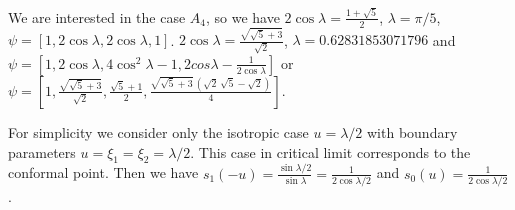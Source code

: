 \documentclass[12pt]{article}
\begin{document}





  We are interested in the case $A_4$, so we have
$2\cos\lambda=\frac{1+\sqrt{5}}{2}$, $\lambda=\pi/5$, $\psi=\left[1,2\cos\lambda,2\cos\lambda,1\right]$.
$2\cos\lambda=\frac{\sqrt{\sqrt{5}+3}}{\sqrt{2}}$,
$\lambda=0.62831853071796$ and $\psi=\left[1,2\cos\lambda,
  4\cos^2\lambda-1, 2cos\lambda-\frac{1}{2\cos\lambda}\right]$ or $\psi=\left[1,\frac{\sqrt{\sqrt{5}+3}}{\sqrt{2}},\frac{\sqrt{5}+1}{2},\frac{\sqrt{\sqrt{5}+3}\,\left( \sqrt{2}\,\sqrt{5}-\sqrt{2}\right) }{4}\right]$.

For simplicity we consider only the isotropic case $u=\lambda/2$ with boundary parameters
$u=\xi_1=\xi_2=\lambda/2$. This case in critical limit corresponds to the  conformal point. Then we have
$s_1(-u)=\frac{\sin\lambda/2}{\sin\lambda}=\frac{1}{2\cos\lambda/2}$ and $s_0(u)=\frac{1}{2\cos\lambda/2}$.
\end{document}
